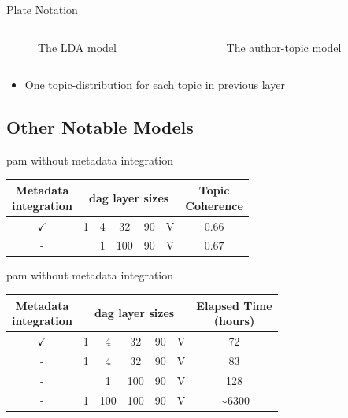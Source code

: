 \begin{frame}{\insertsubsection}{Plate Notation}
	\begin{columns}
		\begin{column}{0.45\textwidth}
			\begin{figure}
				\resizebox{\textwidth}{!}{%
					
				}
				\caption*{The LDA model}
			\end{figure}
		\end{column}
		\begin{column}{0.45\textwidth}
			\begin{figure}
				\resizebox{\textwidth}{!}{%
					
				}
				\caption*{The author-topic model}
			\end{figure}
		\end{column}
	\end{columns}
	\begin{itemize}
		\item One topic-distribution for each topic in previous layer
	\end{itemize}
\end{frame}

\subsection{Other Notable Models}

\begin{frame}{\insertsubsection}{\gls{pam} without metadata integration}
	\begin{tabular}{c|c|c|c|c|c|c}
		\makecell{Metadata \\ integration} & \multicolumn{5}{c}{\gls{dag} layer sizes} \vline & \makecell{Topic \\ Coherence} \\
		\hline
		$\checkmark$ & 1 & 4 & 32 & 90 & V & $0.66$\\
		- & & 1 & 100 & 90 & V & $0.67$ \\
	\end{tabular}
\end{frame}


\begin{frame}{\insertsubsection}{\gls{pam} without metadata integration}
	\begin{tabular}{c|c|c|c|c|c|c}
		\makecell{Metadata \\ integration} & \multicolumn{5}{c}{\gls{dag} layer sizes} \vline & \makecell{Elapsed Time \\ (hours)} \\
		\hline
		$\checkmark$ & 1 & 4 & 32 & 90 & V & 72\\
		- & 1 & 4 & 32 & 90 & V & 83\\
		- & & 1 & 100 & 90 & V &  128\\
		- & 1 & 100 & 100 & 90 & V & $\sim 6300$\\
	\end{tabular}
\end{frame}

